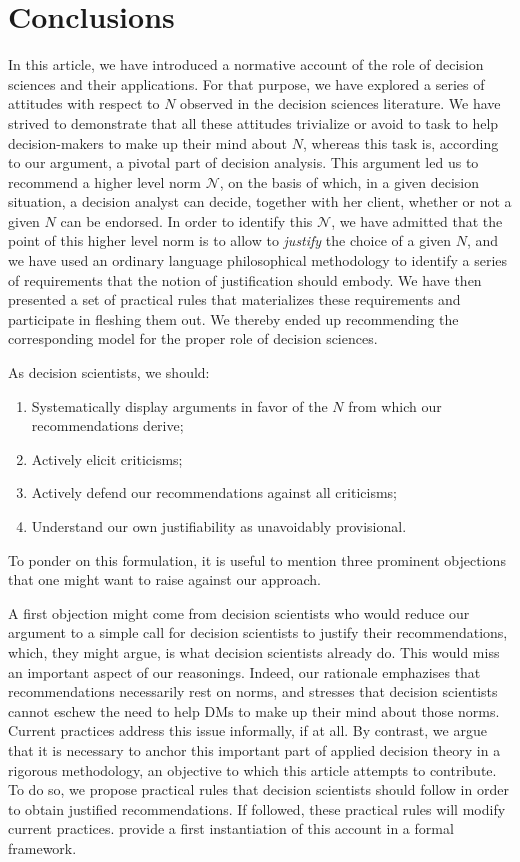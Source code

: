 \documentclass[preprint, french, english, 11pt, authoryear]{elsarticle}%
\newcommand{\adv}{\mathscr{N}}
\begin{document}
\section{Conclusions}
In this article, we have introduced a normative account of the role of decision sciences and their applications. For that purpose, we have explored a series of attitudes with respect to $N$ observed in the decision sciences literature. We have strived to demonstrate that all these attitudes trivialize or avoid to task to help decision-makers to make up their mind about $N$, whereas this task is, according to our argument, a pivotal part of decision analysis. This argument led us to recommend a higher level norm $\adv$, on the basis of which, in a given decision situation, a decision analyst can decide, together with her client, whether or not a given $N$ can be endorsed. In order to identify this $\adv$, we have admitted that the point of this higher level norm is to allow to \emph{justify} the choice of a given $N$, and we have used an ordinary language philosophical methodology to identify a series of requirements that the notion of justification should embody. We have then presented a set of practical rules that materializes these requirements and participate in fleshing them out. We thereby ended up recommending the corresponding model for the proper role of decision sciences.

As decision scientists, we should:
\begin{enumerate}[label=\roman*.]
	\item Systematically display arguments in favor of the $N$ from which our recommendations derive;
	\item Actively elicit criticisms;
	\item Actively defend our recommendations against all criticisms;
	\item Understand our own justifiability as unavoidably provisional.
\end{enumerate}

To ponder on this formulation, it is useful to mention three prominent objections that one might want to raise against our approach.

A first objection might come from decision scientists who would reduce our argument to a simple call for decision scientists to justify their recommendations, which, they might argue, is what decision scientists already do. This would miss an important aspect of our reasonings. Indeed, our rationale emphazises that recommendations necessarily rest on norms, and stresses that decision scientists cannot eschew the need to help \acp{DM} to make up their mind about those norms. Current practices address this issue informally, if at all. By contrast, we argue that it is necessary to anchor this important part of applied decision theory in a rigorous methodology, an objective to which this article attempts to contribute. To do so, we propose practical rules that decision scientists should follow in order to obtain justified recommendations. If followed, these practical rules will modify current practices. \citet{cailloux_formal_2018} provide a first instantiation of this account in a formal framework.
\end{document}
